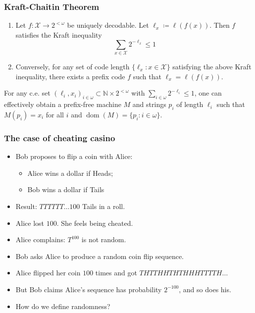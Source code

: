 \documentclass[UTF8,11pt,colorlinks,compress,openany]{beamer}%
\begin{document}
\begin{frame}\frametitle{Kraft-Chaitin Theorem}
\begin{theorem}
\begin{enumerate}
	\item Let $f:\mathcal{X}\to 2^{<\omega}$ be uniquely decodable. Let $\ell_x\coloneqq \ell(f(x))$. Then $f$ satisfies the Kraft inequality
	\[\sum\limits_{x\in\mathcal{X}}2^{-\ell_x}\leq 1\]
	\item Conversely, for any set of code length $\{\ell_x: x\in\mathcal{X}\}$ satisfying the above Kraft inequality, there exists a prefix code $f$ such that $\ell_x=\ell(f(x))$.
\end{enumerate}
\end{theorem}
\begin{theorem}
For any c.e. set $(\ell_i,x_i)_{i\in\omega}\subset\mathbb{N}\times 2^{<\omega}$ with $\sum\limits_{i\in\omega}2^{-\ell_i}\leq 1$, one can effectively obtain a prefix-free machine $M$ and strings $p_i$ of length $\ell_i$ such that $M(p_i)=x_i$ for all $i$ and $\operatorname{dom}(M)=\{p_i: i\in\omega\}$.
\end{theorem}
\end{frame}

\begin{frame}\frametitle{The case of cheating casino}
\begin{itemize}
	\item Bob proposes to flip a coin with Alice:
	\begin{itemize}
		\item Alice wins a dollar if Heads; 
		\item Bob wins a dollar if Tails
	\end{itemize}
	\item Result: $TTTTTT\dots 100$ Tails in a roll.
	\item Alice lost $100$. She feels being cheated.
	\item Alice complains: $T^{100}$ is not random.
	\item Bob asks Alice to produce a random coin flip sequence.
	\item Alice flipped her coin $100$ times and got $THTTHHTHTHHHTTTTH\dots$
 \item But Bob claims Alice's sequence has probability $2^{-100}$, and so does his.
 \item How do we define randomness?
\end{itemize}
\end{frame}
\end{document}
